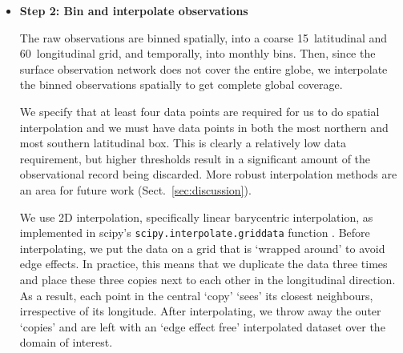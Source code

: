 \begin{itemize}
{        We use the observations on the calibration scales on which they are reported,
        i.e. we do not convert between the calibration scales of different observation networks.
        Time pressure meant that we did not explore the differences between calibration scales in depth.
        This is a limitation, but the differences are acceptable for the purposes of this dataset
        (as in \citet{meinshausen_historical-ghgs_2017},
        see their Section~6.4, Sect.~\ref{sec:output-dataset-requirements}
        and discussion in Sect.~\ref{sec:discussion}).
    }

     \item {
         \textbf{Step 2: Bin and interpolate observations}

         The raw observations are binned spatially,
         into a coarse 15\textdegree~latitudinal and 60\textdegree~longitudinal grid,
         and temporally, into monthly bins.
         Then, since the surface observation network does not cover the entire globe,
         we interpolate the binned observations spatially to get complete global coverage.

         We specify that at least four data points are required for us to do spatial interpolation
         and we must have data points in both the most northern and most southern latitudinal box.
         This is clearly a relatively low data requirement,
         but higher thresholds result in a significant amount of the observational record being discarded.
         More robust interpolation methods are an area for future work (Sect.~\ref{sec:discussion}).

         We use 2D interpolation, specifically linear barycentric interpolation,
         as implemented in scipy's \newline  \texttt{scipy.interpolate.griddata} function \citep{virtanen_scipy_2020}.
         Before interpolating, we put the data on a grid that is `wrapped around' to avoid edge effects.
         In practice, this means that we duplicate the data three times
         and place these three copies next to each other in the longitudinal direction.
         As a result, each point in the central `copy' `sees' its closest neighbours, irrespective of its longitude.
         After interpolating, we throw away the outer `copies'
         and are left with an `edge effect free' interpolated dataset over the domain of interest.

}
\end{itemize}
